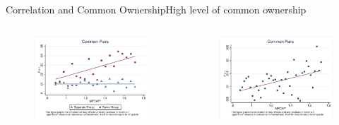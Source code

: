 \documentclass[handout]{beamer}
\begin{document}
\begin{frame}{Correlation and Common Ownership}{High level of common ownership}
		\begin{columns}
				\begin{figure}
					\centering  
					\includegraphics[width=\linewidth]{"Output/Qmcorr5lrdbgsubsample.eps"}
				\end{figure}
			\begin{figure}   
				\centering
				\includegraphics[width=\linewidth]{"Output/Qmcorr5subsample.eps"}     \end{figure}            

		\end{columns}
		\centering
		
		
		
	\end{frame}
		
\end{document}
